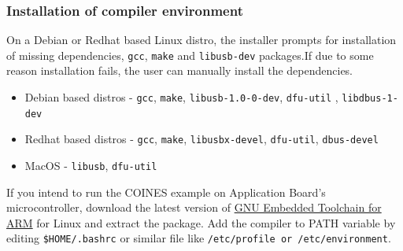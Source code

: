 \documentclass{article}
\begin{document}
\subsubsection{Installation of compiler environment}

On a Debian or Redhat based Linux distro, the installer prompts for installation of missing dependencies, \texttt{gcc}, \texttt{make} and \texttt{libusb-dev} packages.If due to some reason installation fails, the user can manually install the dependencies.
\begin{itemize}
\item Debian based distros - \texttt{gcc}, \texttt{make}, \texttt{libusb-1.0-0-dev}, \texttt{dfu-util} , \texttt{libdbus-1-dev}
\item Redhat based distros - \texttt{gcc}, \texttt{make}, \texttt{libusbx-devel}, \texttt{dfu-util}, \texttt{dbus-devel}
\item MacOS - 
\texttt{libusb}, \texttt{dfu-util}
\end{itemize}

If you intend to run the COINES example on Application Board's microcontroller, download the latest version of \href{https://developer.arm.com/downloads/-/arm-gnu-toolchain-downloads}{GNU Embedded Toolchain for ARM} for Linux and extract the package. Add the compiler to PATH variable by editing \texttt{\$HOME/.bashrc} or similar file like \texttt{/etc/profile or /etc/environment}.
\end{document}
